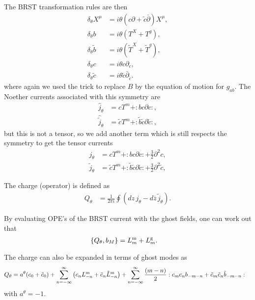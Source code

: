 \documentclass[notitlepage,amsmath,amssymb,aps, pra, 10pt]{revtex4-1}
\begin{document}
    The BRST transformation rules are then
    \begin{align}
        \delta_{\theta} X^{\mu} &= i \theta (c \partial + \tilde c \bar \partial ) X^{\mu},\\
        \delta_{\theta} b &= i \theta ( T^{X} + T^{g} ) ,\\
        \delta _{\theta} \tilde b &= i \theta (\tilde T^{X} + \tilde T^{g} ),\\
        \delta_{\theta} c &= i \theta c \partial_c,\\
        \delta_{\theta} \tilde c &= i \theta \tilde c \bar \partial_{\tilde c}.
    \end{align}
    where again we used the trick to replace $B$ by the equation of motion for $g_{ab}$. The Noether currents associated with this symmetry are
    \begin{align}
        \hat j_{\theta} &= cT^m +:bc\partial c:,\\
        \hat \tilde j_{\theta} &= \tilde cT^m +:\tilde b\tilde c\partial\tilde c:,
    \end{align}
    but this is not a tensor, so we add another term which is still respects the symmetry to get the tensor currents
    \begin{align}
        j_{\theta} &= cT^m +:bc\partial c: + \frac{3}{2} \partial^2c,\\
        \tilde j_{\theta} &= \tilde cT^m +:\tilde b\tilde c\partial\tilde c: + \frac{3}{2} \partial^2\tilde c,
    \end{align}

    The charge (operator) is defined as
    \begin{align}
        Q_{\theta} &= \frac{1}{2\pi i} \oint ( dz \, j_{\theta} - d\overline z \, \tilde j_{\theta}).
    \end{align}

    By evaluating OPE's of the BRST current with the ghost fields, one can work out that
    \begin{align}
        \{Q_{\theta} , b_M \} &= L_m^{\rm m} + L_m^{\rm g}.
    \end{align}

    The charge can also be expanded in terms of ghost modes as
    \begin{align}
        Q_{\theta} &= a^{\theta}(c_0 + \tilde c_0)
         +
        \sum_{n=-\infty}^{\infty}  \left(c_n L_{-n}^{\rm m} + \tilde c_n \tilde L_{-n}^{\rm m}\right)
        +
        \sum_{n=-\infty}^{\infty}\frac{ (m-n)}{2} : c_m c_n b_{-m-n} +  \tilde c_m \tilde c_n \tilde b_{-m-n}:
    \end{align}
    with $a^{\theta} = -1$.
\end{document}
